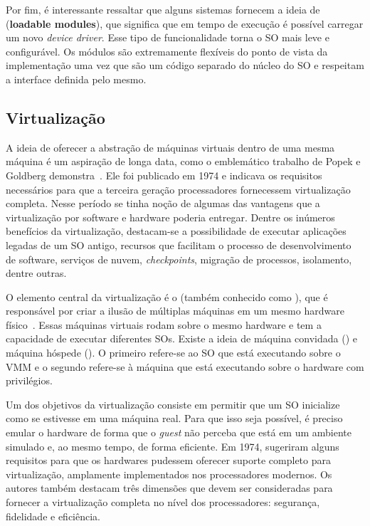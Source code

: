 Por fim, é interessante ressaltar que alguns sistemas fornecem a ideia de
 (\textbf{loadable modules}), que significa
que em tempo de execução é possível carregar um novo \emph{device driver}. Esse
tipo de funcionalidade torna o SO mais leve e configurável. Os módulos
são extremamente flexíveis do ponto de vista da implementação uma vez que são
um código separado do núcleo do SO e respeitam a interface definida pelo mesmo.

\subsection{Virtualização}
\label{sec:virtualizacao}


A ideia de oferecer a abstração de máquinas virtuais dentro de uma mesma
máquina é um aspiração de longa data, como o emblemático trabalho de Popek e
Goldberg demonstra~\citep{popek}. Ele foi publicado em 1974 e indicava os
requisitos necessários para que a terceira geração processadores fornecessem
virtualização completa. Nesse período se tinha noção de algumas das vantagens
que a virtualização por software e hardware poderia entregar. Dentre os
inúmeros benefícios da virtualização, destacam-se a possibilidade de executar
aplicações legadas de um SO antigo, recursos que facilitam o processo de
desenvolvimento de software, serviços de nuvem, \emph{checkpoints}, migração de
processos, isolamento, dentre outras.

O elemento central da virtualização é o  (também
conhecido como ), que é responsável por
criar a ilusão de múltiplas máquinas em um mesmo hardware
físico~\citep{tanenbaum}. Essas máquinas virtuais rodam sobre o mesmo hardware
e tem a capacidade de executar diferentes SOs. Existe a ideia de máquina
convidada () e máquina hóspede (). O
primeiro refere-se ao SO que está executando sobre o VMM e o segundo refere-se
à máquina que está executando sobre o hardware com privilégios.

Um dos objetivos da virtualização consiste em permitir que um SO inicialize
como se estivesse em uma máquina real. Para que isso seja possível, é preciso
emular o hardware de forma que o \emph{guest} não perceba que está em um
ambiente simulado e, ao mesmo tempo, de forma
eficiente. Em 1974, \citet{popek} sugeriram alguns requisitos para que os
hardwares pudessem oferecer suporte completo para virtualização,
amplamente implementados nos processadores modernos. Os autores também
destacam três dimensões que devem ser consideradas para fornecer a
virtualização completa no nível dos processadores: segurança, fidelidade e
eficiência.


